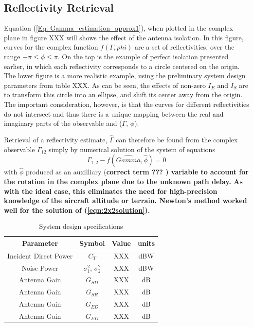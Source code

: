 \documentclass[draftcls,onecolumn]{IEEEtran}  %
\begin{document}
\subsection{Reflectivity Retrieval}
Equation (\ref{Eq: Gamma_estimation_approx1}), when plotted in the complex plane in figure XXX will shows the effect of the antenna isolation. 
In this figure, curves for the complex function $f(\Gamma, phi)$ are a set of reflectivities, over the range $-\pi \leq \phi \leq \pi$.
On the top is the example of perfect isolation presented earlier, in which each reflectivity corresponds to a circle centered on the origin. 
The lower figure is a more realistic example, using the preliminary system design parameters from table XXX. 
As can be seen, the effects of non-zero $I_E$ and $I_S$ are to transform this circle into an ellipse, and shift its center away from the origin. 
The important consideration, however, is that the curves for different reflectivities do not intersect and thus there is a unique mapping between the real and imaginary parts of the observable and ($\Gamma$, $\phi$).  

Retrieval of a reflectivity estimate, $\hat{\Gamma}$ can therefore be found from the complex observable $\Gamma_{12}$ simply by numerical solution of the system of equations
\begin{equation}
\Gamma_{1,2} - f(\hat{Gamma}, \hat{\phi}) = 0
\label{eqn:2x2solution}
\end{equation}
with $\hat{\phi}$ produced as an auxilliary (\bf correct term ??? \rm) variable to account for the rotation in the complex plane due to the unknown path delay.  
As with the ideal case, this eliminates the need for high-precision knowledge of the aircraft altitude or terrain.  Newton's method worked well for the solution of (\ref{eqn:2x2solution}). 

\begin{table}[ht]
\centering
\begin{tabular}  {|c|c|c|c|}
	\hline
     \textbf{Parameter} & \textbf{Symbol}	& \textbf{Value} &	\textbf{units}  \\
     \hline
     Incident Direct Power &	$C_T$ & XXX  & 	dBW	\\
          \hline
     Noise Power &	$\sigma_1^2$, $\sigma_2^2$ & XXX  & 	dBW	\\
     \hline
     Antenna Gain &	$G_{SD}$ & XXX  & 	dB	\\
    \hline
         Antenna Gain &	$G_{SR}$ & XXX  & 	dB	\\
    \hline
         Antenna Gain &	$G_{ED}$ & XXX  & 	dB	\\
    \hline
             Antenna Gain &	$G_{ED}$ & XXX  & 	dB	\\
    \hline
\end{tabular}
\caption{System design specifications}
\label{tab:sysparam}
\end{table}
\end{document}
